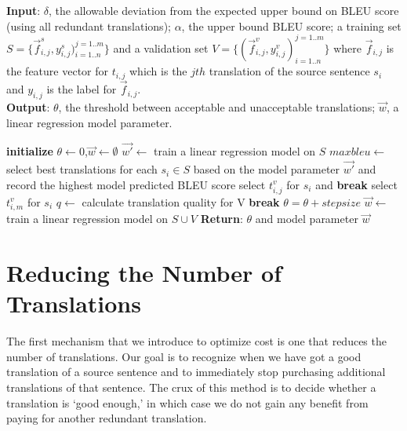 \documentclass[11pt,letterpaper]{article}
\begin{document}
\begin{algorithm}[h!]
\caption{}\label{modelselection}
\textbf{Input}: $\delta$, the allowable deviation from the expected upper bound on BLEU score (using all redundant translations); $\alpha$, the upper bound BLEU score; a training set $S = \{\vec f^{s}_{i,j},y^{s}_{i,j})_{i=1..n}^{j=1..m}\}$ and a validation set $V = \{(\vec f^{v}_{i,j},y^{v}_{i,j})_{i=1..n}^{j=1..m}\}$ where $\vec f_{i,j}$ is the feature vector for $t_{i,j}$ which is the $jth$ translation of the source sentence $s_{i}$ and $y_{i,j}$ is the label for $\vec f_{i,j}$.\\
\textbf{Output}: $\theta$, the threshold between acceptable and unacceptable translations; $\vec{w}$, a linear regression model parameter. 
\begin{algorithmic}[1]
\State \textbf{initialize} $\theta \leftarrow 0$,$\vec{w}\leftarrow \emptyset$ 
\State $\vec{w'}\leftarrow$ train a linear regression model on $S$
\State $maxbleu \leftarrow$ select best translations for each $s_i \in S$ based on the model parameter $\vec{w'}$ and record the highest model predicted BLEU score
             select $t^{v}_{i,j}$ for $s_i$ and \textbf{break}
\EndIf
{} select $t^{v}_{i,m}$ for $s_i$
\EndIf
\EndFor
\EndFor
\State $q \leftarrow$ calculate translation quality for V
 \textbf{break}
\Else \text{  } $\theta = \theta + stepsize$
\EndIf
\EndWhile
\State $\vec {w} \leftarrow$ train a linear regression model on $S \cup V$
\State \textbf{Return}: $\theta$ and model parameter $\vec{w}$
\end{algorithmic}
\end{algorithm}



\section{Reducing the Number of Translations}
The first mechanism that we introduce to optimize cost is one that reduces the number of translations.  Our goal is to recognize when we have got a good translation of a source sentence and to immediately stop purchasing additional  translations of that sentence.  The crux of this method is to decide whether a translation  is `good enough,' in which case we do not gain any benefit from  paying for another redundant translation.  
\end{document}
